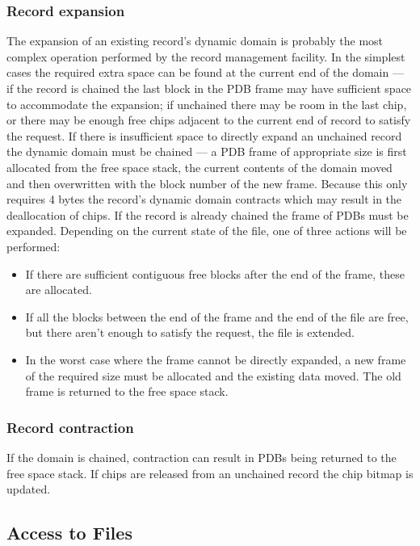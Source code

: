 \subsubsection {Record expansion}

The expansion of an existing record's dynamic domain is probably the most
complex operation performed by the record management facility. In the simplest
cases the required extra space can be found at the current end of the domain
--- if the record is chained the last block in the PDB frame may have
sufficient space to accommodate the expansion; if unchained there may be room
in the last chip, or there may be enough free chips adjacent to the current end
of record to satisfy the request. If there is insufficient space to directly
expand an unchained record the dynamic domain must be chained --- a PDB frame
of appropriate size is first allocated from the free space stack, the current
contents of the domain moved and then overwritten with the block number of the
new frame. Because this only requires 4 bytes the record's dynamic domain
contracts which may result in the deallocation of chips. If the record is
already chained the frame of PDBs must be expanded. Depending on the current
state of the file, one of three actions will be performed:

\begin {itemize}
\item If there are sufficient contiguous free blocks after the end of the frame,
these are allocated.
\item If all the blocks between the end of the frame and the end of the file are
free, but there aren't enough to satisfy the request, the file is extended.
\item In the worst case where the frame cannot be directly expanded, a new frame
of the required size must be allocated and the existing data moved.
The old frame is returned to the free space stack.
\end {itemize}

\subsubsection {Record contraction}

If the domain is chained, contraction can result in PDBs being returned to the
free space stack. If chips are released from an unchained record the chip
bitmap is updated.

\subsection {Access to Files}
\label {access_to_files}

